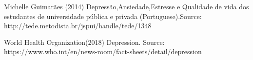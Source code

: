 \documentclass[12pt,openright,a4paper]{article}
\begin{document}
  Michelle Guimarães (2014) Depressão,Ansiedade,Estresse e Qualidade de vida dos estudantes de universidade pública e privada (Portuguese).Source: http://tede.metodista.br/jspui/handle/tede/1348 \newline 
  
  World Health Organization(2018) Depression. Source: https://www.who.int/en/news-room/fact-sheets/detail/depression \newline
  
  
\end{document}

